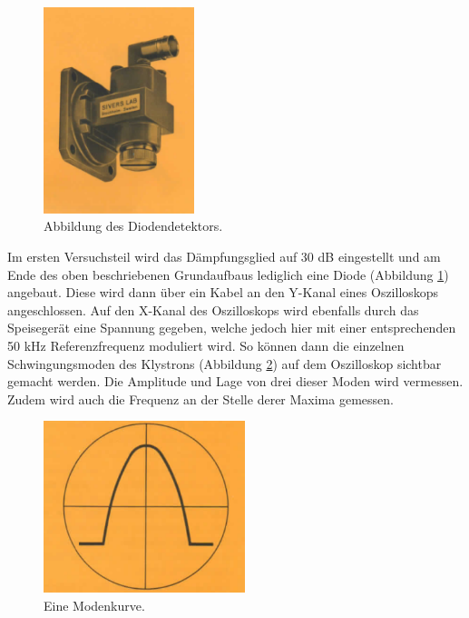 \begin{figure}[H]
  \centering
  \includegraphics[height=6cm]{Diode.PNG}
  \caption{Abbildung des Diodendetektors. \cite{sample1}}
  \label{fig:diode}
\end{figure}

Im ersten Versuchsteil wird das Dämpfungsglied auf 30 dB eingestellt und
am Ende des oben beschriebenen Grundaufbaus lediglich eine Diode (Abbildung \ref{fig:diode}) angebaut.
Diese wird dann über ein Kabel an den Y-Kanal eines
Oszilloskops angeschlossen. Auf den X-Kanal des Oszilloskops wird ebenfalls durch
das Speisegerät eine Spannung gegeben, welche jedoch hier mit einer entsprechenden
50 kHz Referenzfrequenz moduliert wird. So können dann die einzelnen Schwingungsmoden
des Klystrons (Abbildung \ref{fig:mode}) auf dem Oszilloskop sichtbar gemacht werden. Die Amplitude und Lage
von drei dieser Moden wird vermessen. Zudem wird auch die Frequenz an der
Stelle derer Maxima gemessen.

\begin{figure}[H]
  \centering
  \includegraphics[height=5cm]{Mode.PNG}
  \caption{Eine Modenkurve. \cite{sample1}}
  \label{fig:mode}
\end{figure}

